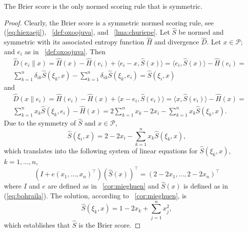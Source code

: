 \documentclass[12pt]{article}
\begin{document}
\begin{lemma}
  \label{lma:zoofooze}
The Brier score is the only normed scoring rule that is symmetric.
\end{lemma}
\begin{proof}
  \label{prf:singachu}
  Clearly, the Brier score is a symmetric normed scoring rule, see
  (\ref{eq:hiexaeji}), {\efinition}~\ref{def:oxoojuva}, and
  {\emma}~\ref{lma:churiepe}. Let $\hat{S}$ be normed and symmetric
  with its associated entropy function $\hat{H}$ and divergence
  $\hat{D}$. Let $x\in\mathcal{P}$; and $e_{i}$ as in
  {\efinition}~\ref{def:oxoojuva}. Then
  \begin{equation}
    \label{eq:fahshain}
    \begin{split}
    & \hat{D}(e_{i}\|x)=\hat{H}(x)-\hat{H}(e_{i})+\langle{}e_{i}-x,\hat{S}(x)\rangle=\langle{}e_{i},\hat{S}(x)\rangle-\hat{H}(e_{i})= \\
    & \sum_{k=1}^{n}\delta_{ik}\hat{S}(\xi_{k},x)-\sum_{k=1}^{n}\delta_{ik}\hat{S}(\xi_{k},e_{i})=\hat{S}(\xi_{i},x)
    \end{split}
  \end{equation}
and
  \begin{equation}
    \label{eq:aineiwoo}
    \begin{split}
    & \hat{D}(x\|e_{i})=\hat{H}(e_{i})-\hat{H}(x)+\langle{}x-e_{i},\hat{S}(e_{i})\rangle=\langle{}x,\hat{S}(e_{i})\rangle-\hat{H}(x)= \\
    & \sum_{k=1}^{n}x_{k}\hat{S}(\xi_{k},e_{i})-\hat{H}(x)=2\sum_{k=1}^{n}x_{k}-2x_{i}-\sum_{k=1}^{n}x_{k}\hat{S}(\xi_{k},x).
    \end{split}
  \end{equation}
Due to the symmetry of $\hat{S}$ and $x\in\mathcal{P}$,
\begin{equation}
  \label{eq:reigemah}
  \hat{S}(\xi_{i},x)=2-2x_{i}-\sum_{k=1}^{n}x_{k}\hat{S}(\xi_{k},x),
\end{equation}
which translates into the following system of linear equations for $\hat{S}(\xi_{k},x)$,
$k=1,{\ldots},n$,
\begin{equation}
  \label{eq:uiziefai}
(I+e(x_{1},{\ldots},x_{n})^{\intercal})(\hat{S}(x))^{\intercal}=(2-2x_{1},{\ldots},2-2x_{n})^{\intercal}
\end{equation}
where $I$ and $e$ are defined as in {\orollary}~\ref{cor:mieghuen} and
$\hat{S}(x)$ is defined as in (\ref{eq:bohraila}). The solution,
according to {\orollary}~\ref{cor:mieghuen}, is
\begin{equation}
  \label{eq:ateechah}
  \hat{S}(\xi_{k},x)=1-2x_{k}+\sum_{j=1}^{n}x_{j}^{2},
\end{equation}
which establishes that $\hat{S}$ is the Brier score.
\end{proof}
\end{document}
